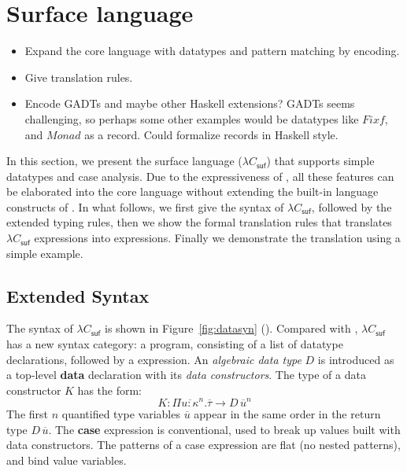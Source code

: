 \section{Surface language}
\label{sec:surface}


\begin{itemize}
\item Expand the core language with datatypes and pattern matching by encoding.
\item Give translation rules.
\item Encode GADTs and maybe other Haskell extensions? GADTs seems challenging, so perhaps some other examples would be datatypes like $Fix f$, and $Monad$ as a record. Could formalize records in Haskell style.
\end{itemize}

\newcommand{\sufcc}{$\lambda C_{\mathsf{suf}}$\xspace}

In this section, we present the surface language (\sufcc) that supports simple datatypes and case analysis. Due to the expressiveness of \name, all these features can be elaborated into the core language without extending the built-in language constructs of \name. In what follows, we first give the syntax of \sufcc, followed by the extended typing rules, then we show the formal translation rules that translates \sufcc expressions into \name expressions. Finally we demonstrate the translation using a simple example.

\subsection{Extended Syntax}

The syntax of \sufcc is shown in Figure~\ref{fig:datasyn} (). Compared with \name, \sufcc has a new syntax category: a program, consisting of a list of datatype declarations, followed by a expression. An \emph{algebraic data type} $D$ is introduced as a top-level \textbf{data} declaration with its \emph{data constructors}. The type of a data constructor $K$ has the form: \[K : \Pi\overline{u : \kappa}^{n}.\overline{\tau} \rightarrow D\,\overline{u}^{n} \] The first $n$ quantified type variables $\overline{u}$ appear in the same order in the return type $D\,\overline{u}$. The \textbf{case} expression is conventional, used to break up values built with data constructors. The patterns of a case expression are flat (no nested patterns), and bind value variables.

